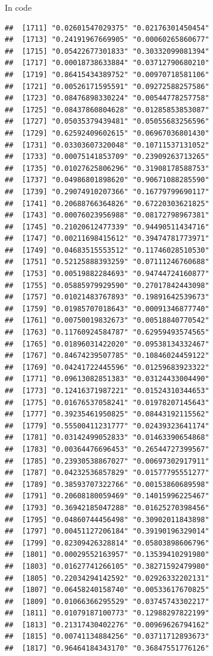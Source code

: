 \documentclass[ignorenonframetext,]{beamer}
\begin{document}
\begin{frame}[fragile]{In code}
\begin{verbatim}
##  [1711] "0.02601547029375" "0.02176301450454"
##  [1713] "0.24191967669905" "0.00060265860677"
##  [1715] "0.05422677301833" "0.30332099081394"
##  [1717] "0.00018738633884" "0.03712790680210"
##  [1719] "0.86415434389752" "0.00970718581106"
##  [1721] "0.00526171595591" "0.09272588257586"
##  [1723] "0.08476898330224" "0.00544778257758"
##  [1725] "0.08437860804628" "0.01285853853087"
##  [1727] "0.05035379439481" "0.05055683256596"
##  [1729] "0.62592409602615" "0.06967036801430"
##  [1731] "0.03303607320048" "0.10711537131052"
##  [1733] "0.00075141853709" "0.23909263713265"
##  [1735] "0.01027625806296" "0.31908178588753"
##  [1737] "0.04986801898620" "0.90671088285590"
##  [1739] "0.29074910207366" "0.16779799690117"
##  [1741] "0.20688766364826" "0.67220303621825"
##  [1743] "0.00076023956988" "0.08172798967381"
##  [1745] "0.21020612477339" "0.94490511434716"
##  [1747] "0.00211698415612" "0.39474781773971"
##  [1749] "0.04683515553512" "0.11746028510530"
##  [1751] "0.52125888393259" "0.07111246760688"
##  [1753] "0.00519882284693" "0.94744724160877"
##  [1755] "0.05885979929590" "0.27017842443098"
##  [1757] "0.01021483767893" "0.19891642539673"
##  [1759] "0.01985707018643" "0.00091346877740"
##  [1761] "0.00750019832673" "0.00518840770542"
##  [1763] "0.11760924584787" "0.62959493574565"
##  [1765] "0.01896031422020" "0.09538134332467"
##  [1767] "0.84674239507785" "0.10846024459122"
##  [1769] "0.04241722445596" "0.01259683923322"
##  [1771] "0.09613082851383" "0.03124433004490"
##  [1773] "0.12416371987221" "0.01524310344653"
##  [1775] "0.01676537058241" "0.01978207145643"
##  [1777] "0.39235461950825" "0.08443192115562"
##  [1779] "0.55500411231777" "0.02439323641174"
##  [1781] "0.03142499052833" "0.01463390654868"
##  [1783] "0.00364476696453" "0.26544727399567"
##  [1785] "0.23930538867027" "0.00697302917911"
##  [1787] "0.04232536857829" "0.01577795551277"
##  [1789] "0.38593707322766" "0.00153860689598"
##  [1791] "0.20608180059469" "0.14015996225467"
##  [1793] "0.36942185047288" "0.01625270398456"
##  [1795] "0.04860744456498" "0.30902011843898"
##  [1797] "0.00451127206184" "0.39190196329014"
##  [1799] "0.82309426328814" "0.05803898606796"
##  [1801] "0.00029552163957" "0.13539410291980"
##  [1803] "0.01627741266105" "0.38271592479980"
##  [1805] "0.22034294142592" "0.02926332202131"
##  [1807] "0.06458240158740" "0.00533617670825"
##  [1809] "0.01066366295529" "0.03745743302217"
##  [1811] "0.01079187100773" "0.12988297822199"
##  [1813] "0.21317430402276" "0.00969626794162"
##  [1815] "0.00741134884256" "0.03711712893673"
##  [1817] "0.96464184343170" "0.36847551776126"

\end{verbatim}
\end{frame}
\end{document}
